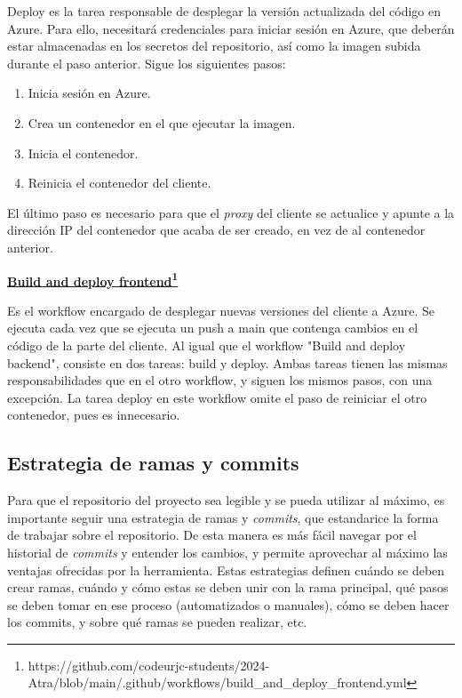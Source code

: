 Deploy es la tarea responsable de desplegar la versión actualizada del código en Azure. Para ello, necesitará credenciales para iniciar sesión en Azure, que deberán estar almacenadas en los secretos del repositorio, así como la imagen subida durante el paso anterior. Sigue los siguientes pasos:
\begin{enumerate}
    \item Inicia sesión en Azure.
    \item Crea un contenedor en el que ejecutar la imagen.
    \item Inicia el contenedor.
    \item Reinicia el contenedor del cliente.
\end{enumerate}
El último paso es necesario para que el \textit{proxy} del cliente se actualice y apunte a la dirección IP del contenedor que acaba de ser creado, en vez de al contenedor anterior.

\textbf{\href{https://github.com/codeurjc-students/2024-Atra/blob/main/.github/workflows/build_and_deploy_frontend.yml}{\uline{Build and deploy frontend}\footnote{\url{https://github.com/codeurjc-students/2024-Atra/blob/main/.github/workflows/build_and_deploy_frontend.yml}}}}

Es el workflow encargado de desplegar nuevas versiones del cliente a Azure. Se ejecuta cada vez que se ejecuta un push a main que contenga cambios en el código de la parte del cliente. Al igual que el workflow "Build and deploy backend", consiste en dos tareas: build y deploy. Ambas tareas tienen las mismas responsabilidades que en el otro workflow, y siguen los mismos pasos, con una excepción. La tarea deploy en este workflow omite el paso de reiniciar el otro contenedor, pues es innecesario.


\subsection{Estrategia de ramas y commits}
Para que el repositorio del proyecto sea legible y se pueda utilizar al máximo, es importante seguir una estrategia de ramas y \textit{commits}, que estandarice la forma de trabajar sobre el repositorio. De esta manera es más fácil navegar por el historial de \textit{commits} y entender los cambios, y permite aprovechar al máximo las ventajas ofrecidas por la herramienta. Estas estrategias definen cuándo se deben crear ramas, cuándo y cómo estas se deben unir con la rama principal, qué pasos se deben tomar en ese proceso (automatizados o manuales), cómo se deben hacer los commits, y sobre qué ramas se pueden realizar, etc.

